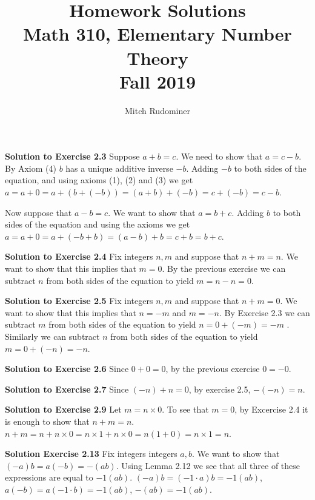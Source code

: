 \documentclass[oneside,12pt]{amsart}
\begin{document}
\title{Homework Solutions \\ Math 310, Elementary Number Theory \\ Fall 2019}
\author{Mitch Rudominer}

\maketitle

\textbf{Solution to Exercise 2.3} Suppose $a+b = c$. We need to show that $a=c-b$.
By Axiom (4) $b$ has a unique additive inverse $-b$. Adding $-b$
to both sides of the equation, and
using axioms (1), (2) and (3) we get
$a= a+0 = a + (b + (-b)) = (a+b) + (-b) = c + (-b) = c-b$.

Now suppose that $a-b = c$. We want to show that $a=b+c$.
Adding $b$ to both sides of the equation and using
the axioms we get
$a = a + 0 = a + (-b + b) = (a - b) +b  = c + b = b+c$.

\bigskip


\textbf{Solution to Exercise 2.4} Fix integers $n,m$ and suppose that $n+m=n$.
We want to show that this implies that $m=0$.
By the previous exercise we  can subtract $n$ from both sides of the equation
to yield $m = n - n = 0$.


\bigskip


\textbf{Solution to Exercise 2.5} Fix integers $n,m$ and suppose that $n+m=0$.
We want to show that this implies that $n=-m$ and $m=-n$.
By Exercise 2.3 we can subtract $m$ from both sides of the equation to yield
 $n = 0+ (-m) = -m$ . Similarly we can subtract $n$ from both sides of the
 equation to yield $m=0+(-n) = -n$.

\bigskip


\textbf{Solution to Exercise 2.6} Since $0+0 = 0$, by the previous exercise
$0=-0$.


\bigskip


\textbf{Solution to Exercise 2.7} Since $(-n) + n = 0$, by exercise 2.5,
$-(-n) = n$.

\bigskip


\textbf{Solution to Exercise 2.9} Let $m=n\times 0$. To see that $m=0$, by
Excercise 2.4 it is enough to show that $n+m=n$.
$n+m = n + n\times 0 = n\times 1 + n\times 0
= n (1 + 0) = n \times 1 = n$.


\bigskip


\textbf{Solution Exercise 2.13} Fix integers integers $a, b$.
We want to show that $(-a)b = a(-b) = -(ab)$. Using Lemma 2.12
we see that all three of these expressions are equal to $-1(ab)$.
$(-a)b=(-1\cdot a)b = -1(ab)$, $a(-b)=a(-1\cdot b) = -1(ab)$,
$-(ab) = -1(ab)$.
\end{document}

